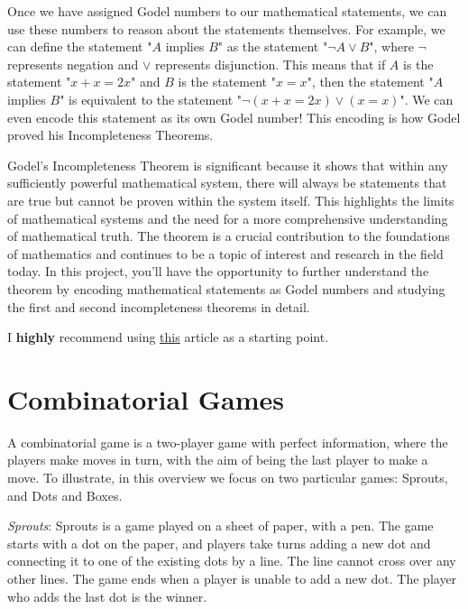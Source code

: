 \documentclass{article}
\begin{document}
\vspace{3mm}
Once we have assigned Godel numbers to our mathematical statements, we can use these numbers to reason about the statements themselves. For example, we can define the statement "$A$ implies $B$" as the statement "$\neg A \vee B$", where $\neg$ represents negation and $\vee$ represents disjunction. This means that if $A$ is the statement "$x + x = 2x$" and $B$ is the statement "$x = x$", then the statement "$A$ implies $B$" is equivalent to the statement "$\neg(x + x = 2x) \vee (x = x)$". We can even encode this statement as its own Godel number! This encoding is how Godel proved his Incompleteness Theorems.

\vspace{3mm}
Godel's Incompleteness Theorem is significant because it shows that within any sufficiently powerful mathematical system, there will always be statements that are true but cannot be proven within the system itself. This highlights the limits of mathematical systems and the need for a more comprehensive understanding of mathematical truth. The theorem is a crucial contribution to the foundations of mathematics and continues to be a topic of interest and research in the field today. In this project, you'll have the opportunity to further understand the theorem by encoding mathematical statements as Godel numbers and studying the first and second incompleteness theorems in detail.

\vspace{3mm}
I \textbf{highly} recommend using \href{https://www.quantamagazine.org/how-godels-incompleteness-theorems-work-20200714/}{this} article as a starting point.

\pagebreak 

\section{Combinatorial Games}
    A combinatorial game is a two-player game with perfect information, where the players make moves in turn, with the aim of being the last player to make a move. To illustrate, in this overview we focus on two particular games: Sprouts, and Dots and Boxes.
    
    \vspace{3mm}
    \textit{Sprouts}: Sprouts is a game played on a sheet of paper, with a pen. The game starts with a dot on the paper, and players take turns adding a new dot and connecting it to one of the existing dots by a line. The line cannot cross over any other lines. The game ends when a player is unable to add a new dot. The player who adds the last dot is the winner.
    
\end{document}
